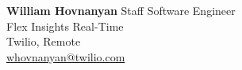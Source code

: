 \item \textbf{William Hovnanyan} \hfill {Staff Software Engineer}\\
    Flex Insights Real-Time\\
    Twilio, Remote\\
    \faEnvelope \hspace{0.5mm} \href{mailto:whovnanyan@twilio.com}{whovnanyan@twilio.com}